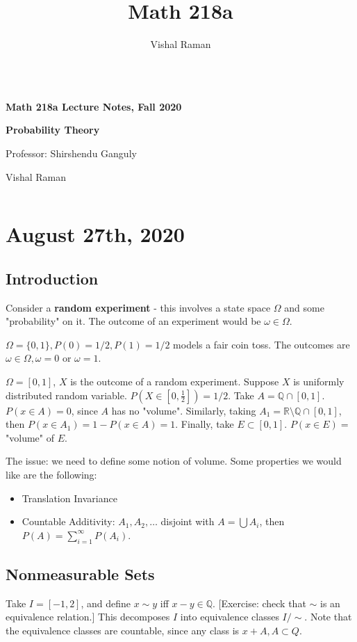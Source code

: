 \documentclass[11pt]{scrartcl}
\newcommand{\Q}{\mathbb{Q}}
\newcommand{\R}{\mathbb{R}}
\begin{document}
\title{Math 218a}
\author{Vishal Raman}
\thispagestyle{empty}
$ $
\vfill
\begin{center}

\centerline{\huge \textbf{Math 218a Lecture Notes, Fall 2020}}
\centerline{\Large \textbf{Probability Theory} } 
\centerline{Professor: Shirshendu Ganguly}
\centerline{Vishal Raman}
\end{center}
\vfill
$ $
\newpage
\thispagestyle{empty}
\tableofcontents
\newpage
\section{August 27th, 2020}
\subsection{Introduction}
Consider a \textbf{random experiment} - this involves a state space $\Omega$ and some "probability" on it.  The outcome of an experiment would be $\omega \in \Omega$.

\begin{example} $\Omega = \{0, 1\}, P(0) = 1/2, P(1) = 1/2$ models a fair coin toss.  The outcomes are $\omega \in \Omega, \omega = 0$ or $\omega = 1$.
\end{example}
\begin{example} $\Omega = [0, 1]$, $X$ is the outcome of a random experiment.  Suppose $X$ is uniformly distributed random variable.  $P(X \in [0, \frac{1}{2}]) = 1/2$.  Take $A = \Q \cap [0, 1]$.  $P(x \in A) = 0$, since $A$ has no "volume".  Similarly, taking $A_1 = \R\setminus\Q \cap [0, 1]$, then $P(x \in A_1) = 1 - P(x \in A) = 1$.  Finally, take $E \subset [0, 1]$.  $P(x \in E) = $"volume" of $E$.   
\end{example}
The issue: we need to define some notion of volume.  Some properties we would like are the following:
\begin{itemize}
\item Translation Invariance
\item Countable Additivity: $A_1, A_2, \dots$ disjoint with $A = \bigcup A_i$, then $P(A) = \sum_{i=1}^{\infty}P(A_i)$.
\end{itemize}
\subsection{Nonmeasurable Sets}
Take $I = [-1, 2]$, and define $x \sim y$ iff $x-y \in \Q$. [Exercise: check that $\sim$ is an equivalence relation.]  This decomposes $I$ into equivalence classes $I/\sim$.  Note that the equivalence classes are countable, since any class is $x + A, A \subset Q$.  
\end{document}

